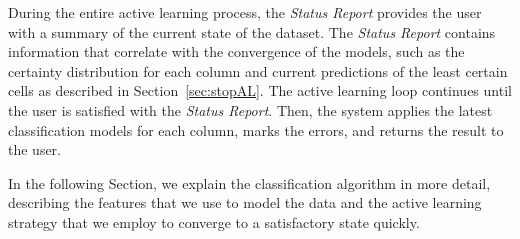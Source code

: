 During the entire active learning process, the \emph{Status Report} provides the user with a summary of the current state of the dataset. The \emph{Status Report} contains information that correlate with the convergence of the models, such as the certainty distribution for each column and current predictions of the least certain cells as described in Section~\ref{sec:stopAL}.
The active learning loop continues until the user is satisfied with the \emph{Status Report}. Then, the system applies the latest classification models for each column, marks the errors, and returns the result to the user. 

In the following Section, we explain the classification algorithm in more detail, describing the features that we use to model the data and the active learning strategy that we employ to converge to a satisfactory state quickly.
